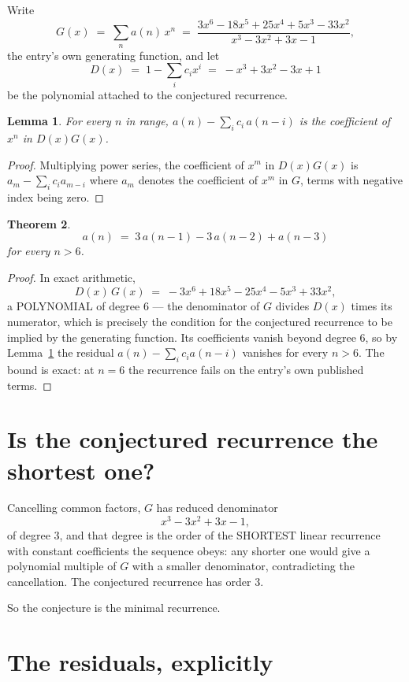 \documentclass[11pt,a4paper]{article}
\theoremstyle{plain}
\newtheorem{theorem}{Theorem}
\newtheorem{lemma}[theorem]{Lemma}
\theoremstyle{definition}
\begin{document}
Write
\[
G(x)\;=\;\sum_{n}a(n)\,x^{n}\;=\;\frac{3 x^{6} - 18 x^{5} + 25 x^{4} + 5 x^{3} - 33 x^{2}}{x^{3} - 3 x^{2} + 3 x - 1},
\]
the entry's own generating function, and let
\[
D(x)\;=\;1-\sum_i c_i x^{i}\;=\;- x^{3} + 3 x^{2} - 3 x + 1
\]
be the polynomial attached to the conjectured recurrence.

\begin{lemma}\label{lem:key}
For every $n$ in range, $a(n)-\sum_i c_i\,a(n-i)$ is the coefficient of $x^{n}$ in
$D(x)G(x)$.
\end{lemma}

\begin{proof}
Multiplying power series, the coefficient of $x^{m}$ in $D(x)G(x)$ is
$a_m-\sum_i c_i a_{m-i}$ where $a_m$ denotes the coefficient of $x^{m}$ in $G$, terms with
negative index being zero.
\end{proof}

\begin{theorem}
\[
a(n)\;=\;3\,a(n-1) - 3\,a(n-2) + a(n-3)
\]
for every $n>6$.
\end{theorem}

\begin{proof}
In exact arithmetic,
\[
D(x)\,G(x)\;=\;- 3 x^{6} + 18 x^{5} - 25 x^{4} - 5 x^{3} + 33 x^{2},
\]
a POLYNOMIAL of degree $6$ --- the denominator of $G$ divides $D(x)$ times its numerator,
which is precisely the condition for the conjectured recurrence to be implied by the
generating function. Its coefficients vanish beyond degree $6$, so by
Lemma~\ref{lem:key} the residual $a(n)-\sum_ic_ia(n-i)$ vanishes for every
$n>6$. The bound is exact: at $n=6$ the recurrence fails on the entry's own published terms.
\end{proof}

\section{Is the conjectured recurrence the shortest one?}

Cancelling common factors, $G$ has reduced denominator
\[
x^{3} - 3 x^{2} + 3 x - 1,
\]
of degree $3$, and that degree is the order of the SHORTEST linear recurrence with
constant coefficients the sequence obeys: any shorter one would give a polynomial multiple of
$G$ with a smaller denominator, contradicting the cancellation. The conjectured recurrence has
order $3$.

So the conjecture is the minimal recurrence.

\section{The residuals, explicitly}
\end{document}
